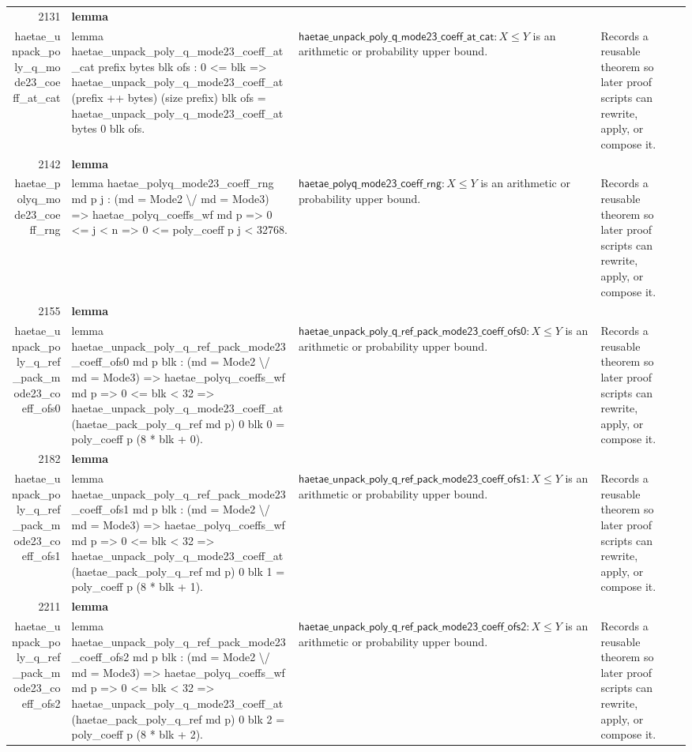 \documentclass[10pt]{article}
\newcommand{\ec}[1]{\begingroup\ttfamily\scriptsize #1\endgroup}
\begin{document}
\begin{longtable}{r L{0.17\textwidth} L{0.26\textwidth} L{0.27\textwidth} L{0.20\textwidth}}
2131 & \textbf{lemma}\\\ec{haetae\_unpack\_poly\_q\_mode23\_coeff\_at\_cat} & \ec{lemma haetae\_unpack\_poly\_q\_mode23\_coeff\_at\_cat prefix bytes blk ofs : 0 <= blk => haetae\_unpack\_poly\_q\_mode23\_coeff\_at (prefix ++ bytes) (size prefix) blk ofs = haetae\_unpack\_poly\_q\_mode23\_coeff\_at bytes 0 blk ofs.} & \(\mathsf{haetae\_unpack\_poly\_q\_mode23\_coeff\_at\_cat} : X \le Y\) is an arithmetic or probability upper bound. & Records a reusable theorem so later proof scripts can rewrite, apply, or compose it. \\
2142 & \textbf{lemma}\\\ec{haetae\_polyq\_mode23\_coeff\_rng} & \ec{lemma haetae\_polyq\_mode23\_coeff\_rng md p j : (md = Mode2 \textbackslash{}/ md = Mode3) => haetae\_polyq\_coeffs\_wf md p => 0 <= j < n => 0 <= poly\_coeff p j < 32768.} & \(\mathsf{haetae\_polyq\_mode23\_coeff\_rng} : X \le Y\) is an arithmetic or probability upper bound. & Records a reusable theorem so later proof scripts can rewrite, apply, or compose it. \\
2155 & \textbf{lemma}\\\ec{haetae\_unpack\_poly\_q\_ref\_pack\_mode23\_coeff\_ofs0} & \ec{lemma haetae\_unpack\_poly\_q\_ref\_pack\_mode23\_coeff\_ofs0 md p blk : (md = Mode2 \textbackslash{}/ md = Mode3) => haetae\_polyq\_coeffs\_wf md p => 0 <= blk < 32 => haetae\_unpack\_poly\_q\_mode23\_coeff\_at (haetae\_pack\_poly\_q\_ref md p) 0 blk 0 = poly\_coeff p (8 * blk + 0).} & \(\mathsf{haetae\_unpack\_poly\_q\_ref\_pack\_mode23\_coeff\_ofs0} : X \le Y\) is an arithmetic or probability upper bound. & Records a reusable theorem so later proof scripts can rewrite, apply, or compose it. \\
2182 & \textbf{lemma}\\\ec{haetae\_unpack\_poly\_q\_ref\_pack\_mode23\_coeff\_ofs1} & \ec{lemma haetae\_unpack\_poly\_q\_ref\_pack\_mode23\_coeff\_ofs1 md p blk : (md = Mode2 \textbackslash{}/ md = Mode3) => haetae\_polyq\_coeffs\_wf md p => 0 <= blk < 32 => haetae\_unpack\_poly\_q\_mode23\_coeff\_at (haetae\_pack\_poly\_q\_ref md p) 0 blk 1 = poly\_coeff p (8 * blk + 1).} & \(\mathsf{haetae\_unpack\_poly\_q\_ref\_pack\_mode23\_coeff\_ofs1} : X \le Y\) is an arithmetic or probability upper bound. & Records a reusable theorem so later proof scripts can rewrite, apply, or compose it. \\
2211 & \textbf{lemma}\\\ec{haetae\_unpack\_poly\_q\_ref\_pack\_mode23\_coeff\_ofs2} & \ec{lemma haetae\_unpack\_poly\_q\_ref\_pack\_mode23\_coeff\_ofs2 md p blk : (md = Mode2 \textbackslash{}/ md = Mode3) => haetae\_polyq\_coeffs\_wf md p => 0 <= blk < 32 => haetae\_unpack\_poly\_q\_mode23\_coeff\_at (haetae\_pack\_poly\_q\_ref md p) 0 blk 2 = poly\_coeff p (8 * blk + 2).} & \(\mathsf{haetae\_unpack\_poly\_q\_ref\_pack\_mode23\_coeff\_ofs2} : X \le Y\) is an arithmetic or probability upper bound. & Records a reusable theorem so later proof scripts can rewrite, apply, or compose it. \\

\end{longtable}
\end{document}
